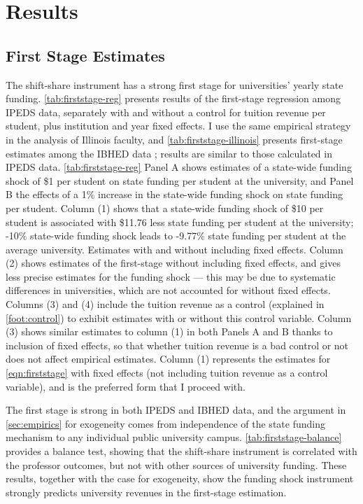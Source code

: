\section{Results}
\label{sec:results}

\subsection{First Stage Estimates}
The shift-share instrument has a strong first stage for universities' yearly state funding.
\autoref{tab:firststage-reg} presents results of the first-stage regression among IPEDS data, separately with and without a control for tuition revenue per student, plus institution and year fixed effects.
I use the same empirical strategy in the analysis of Illinois faculty, and \autoref{tab:firststage-illinois} presents first-stage estimates among the IBHED data ; results are similar to those calculated in IPEDS data.
\autoref{tab:firststage-reg} Panel A shows estimates of a state-wide funding shock of \$1 per student on state funding per student at the university, and Panel B the effects of a 1\% increase in the state-wide funding shock on state funding per student.
Column (1) shows that a state-wide funding shock of \$10 per student is associated with \$11.76 less state funding per student at the university; -10\% state-wide funding shock leads to -9.77\% state funding per student at the average university.
Estimates with and without including fixed effects.
Column (2) shows estimates of the first-stage without including fixed effects, and gives less precise estimates for the funding shock --- this may be due to systematic differences in universities, which are not accounted for without fixed effects.
Columns (3) and (4) include the tuition revenue as a control (explained in \autoref{foot:control}) to exhibit estimates with or without this control variable.
Column (3) shows similar estimates to column (1) in both Panels A and B thanks to inclusion of fixed effects, so that 
whether tuition revenue is a bad control or not does not affect empirical estimates.
Column (1) represents the estimates for \autoref{eqn:firststage} with fixed effects (not including tuition revenue as a control variable), and is the preferred form that I proceed with.

The first stage is strong in both IPEDS and IBHED data, and the argument in \autoref{sec:empirics} for exogeneity comes from independence of the state funding mechanism to any individual public university campus.
\autoref{tab:firststage-balance} provides a balance test, showing that the shift-share instrument is correlated with the professor outcomes, but not with other sources of university funding.
These results, together with the case for exogeneity, show the funding shock instrument
strongly predicts university revenues in the first-stage estimation.

